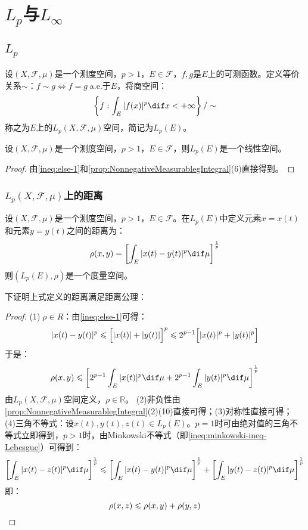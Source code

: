\section{$L_p$与$L_{\infty}$}

\subsection{$L_p$}
\begin{definition}
	设$(X,\mathscr{F},\mu)$是一个测度空间，$p>1$，$E\in\mathscr{F}$，$f,g$是$E$上的可测函数。定义等价关系$\sim$：$f\sim g\Leftrightarrow f=g\;$a.e.于$E$，将商空间：
	\begin{equation*}
		\left\{f:\int_{E}^{}|f(x)|^p\dif x<+\infty\right\}/\sim
	\end{equation*}
	称之为$E$上的$L_p(X,\mathscr{F},\mu)$空间，简记为$L_p(E)$。
\end{definition}
\begin{property}
	设$(X,\mathscr{F},\mu)$是一个测度空间，$p>1$，$E\in\mathscr{F}$，则$L_p(E)$是一个线性空间。
\end{property}
\begin{proof}
	由\cref{ineq:else-1}和\cref{prop:NonnegativeMeasurablegIntegral}(6)直接得到。
\end{proof}
\subsubsection{$L_p(X,\mathscr{F},\mu)$上的距离}
\begin{definition}
	设$(X,\mathscr{F},\mu)$是一个测度空间，$p>1$，$E\in\mathscr{F}$。在$L_p(E)$中定义元素$x=x(t)$和元素$y=y(t)$之间的距离为：
	\begin{equation*}
		\rho(x,y)=\left[\int_{E}^{}|x(t)-y(t)|^p\dif\mu\right]^\frac{1}{p}
	\end{equation*}
	则$(L_p(E),\rho)$是一个度量空间。
\end{definition}
下证明上式定义的距离满足距离公理：
\begin{proof}
	(1)$\;\rho\in R$：由\cref{ineq:else-1}可得：
	\begin{equation*}
		|x(t)-y(t)|^p\leqslant\Bigl[|x(t)|+|y(t)|\Bigr]^p\leqslant2^{p-1}\Bigl[|x(t)|^p+|y(t)|^p\Bigr]
	\end{equation*}
	于是：
	\begin{equation*}
		\rho(x,y)\leqslant\left[2^{p-1}\int_{E}^{}|x(t)|^p\dif\mu+2^{p-1}\int_{E}^{}|y(t)|^p\dif\mu\right]^{\frac{1}{p}}
	\end{equation*}
	由$L_p(X,\mathscr{F},\mu)$空间定义，$\rho\in\mathbb{R}$。
	(2)非负性由\cref{prop:NonnegativeMeasurablegIntegral}(2)(10)直接可得；(3)对称性直接可得；
	(4)三角不等式：设$x(t),y(t),z(t)\in L_p(E)$。$p=1$时可由绝对值的三角不等式立即得到，$p>1$时，由Minkowski不等式（即\cref{ineq:minkowski-ineq-Lebesgue}）可得到：
	\begin{equation*}
		\left[\int_{E}|x(t)-z(t)|^p\dif\mu\right]^{\frac{1}{p}} \leqslant \left[\int_{E}|x(t)-y(t)|^p\dif\mu\right]^{\frac{1}{p}} + \left[\int_{E}|y(t)-z(t)|^p\dif\mu\right]^{\frac{1}{p}}
	\end{equation*}
	即：
	\begin{equation*}
		\rho(x,z)\leqslant\rho(x,y)+\rho(y,z)\qedhere
	\end{equation*}
\end{proof}
